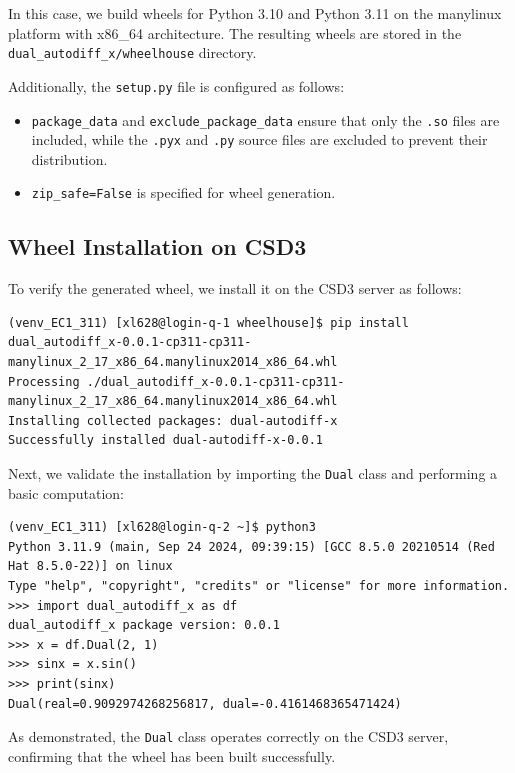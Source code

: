 \documentclass{article}
\begin{document}
In this case, we build wheels for Python 3.10 and Python 3.11 on the manylinux platform with x86\_64 architecture. The resulting wheels are stored in the \texttt{dual\_autodiff\_x/wheelhouse} directory.

Additionally, the \texttt{setup.py} file is configured as follows:

\begin{itemize} 
    \item \texttt{package\_data} and \texttt{exclude\_package\_data} ensure that only the \texttt{.so} files are included, while the \texttt{.pyx} and \texttt{.py} source files are excluded to prevent their distribution. 
    \item \texttt{zip\_safe=False} is specified for wheel generation.
\end{itemize}

\subsection{Wheel Installation on CSD3}

To verify the generated wheel, we install it on the CSD3 server as follows:

\begin{lstlisting}[style=input]
(venv_EC1_311) [xl628@login-q-1 wheelhouse]$ pip install dual_autodiff_x-0.0.1-cp311-cp311-manylinux_2_17_x86_64.manylinux2014_x86_64.whl 
Processing ./dual_autodiff_x-0.0.1-cp311-cp311-manylinux_2_17_x86_64.manylinux2014_x86_64.whl
Installing collected packages: dual-autodiff-x
Successfully installed dual-autodiff-x-0.0.1
\end{lstlisting}

Next, we validate the installation by importing the \texttt{Dual} class and performing a basic computation:

\begin{lstlisting}[style=input]
(venv_EC1_311) [xl628@login-q-2 ~]$ python3
Python 3.11.9 (main, Sep 24 2024, 09:39:15) [GCC 8.5.0 20210514 (Red Hat 8.5.0-22)] on linux
Type "help", "copyright", "credits" or "license" for more information.
>>> import dual_autodiff_x as df
dual_autodiff_x package version: 0.0.1
>>> x = df.Dual(2, 1)
>>> sinx = x.sin()
>>> print(sinx)
Dual(real=0.9092974268256817, dual=-0.4161468365471424)
\end{lstlisting}

As demonstrated, the \texttt{Dual} class operates correctly on the CSD3 server, confirming that the wheel has been built successfully.
\end{document}
